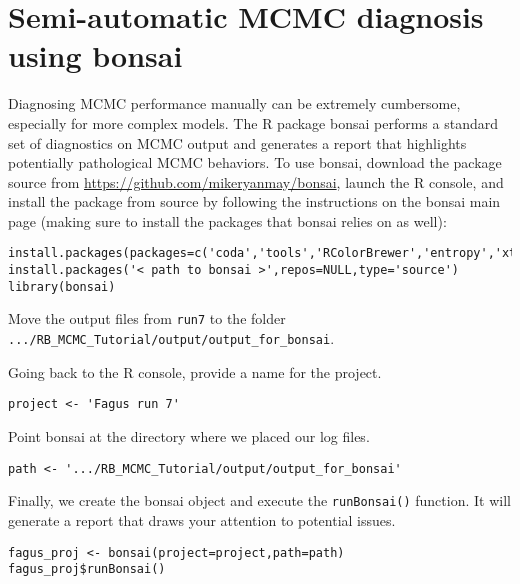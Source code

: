 	
	

\bigskip
\section{Semi-automatic MCMC diagnosis using bonsai}

Diagnosing MCMC performance manually can be extremely cumbersome, especially for more complex models.
The R package bonsai performs a standard set of diagnostics on MCMC output and generates a report that highlights potentially pathological MCMC behaviors.
To use bonsai, download the package source from \href{https://github.com/mikeryanmay/bonsai}{https://github.com/mikeryanmay/bonsai}, launch the R console, and install the package from source by following the instructions on the bonsai main page (making sure to install the packages that bonsai relies on as well):
{\tt \begin{snugshade*}
\begin{lstlisting}
install.packages(packages=c('coda','tools','RColorBrewer','entropy','xtable'),dependencies=TRUE)
install.packages('< path to bonsai >',repos=NULL,type='source')
library(bonsai)
\end{lstlisting}
\end{snugshade*}}

Move the output files from \texttt{run7} to the folder \verb!.../RB_MCMC_Tutorial/output/output_for_bonsai!.

Going back to the R console, provide a name for the project.
{\tt \begin{snugshade*}
\begin{lstlisting}
project <- 'Fagus run 7'
\end{lstlisting}
\end{snugshade*}}

Point bonsai at the directory where we placed our log files.
{\tt \begin{snugshade*}
\begin{lstlisting}
path <- '.../RB_MCMC_Tutorial/output/output_for_bonsai'
\end{lstlisting}
\end{snugshade*}}

Finally, we create the bonsai object and execute the \texttt{runBonsai()} function.
It will generate a report that draws your attention to potential issues.
{\tt \begin{snugshade*}
\begin{lstlisting}
fagus_proj <- bonsai(project=project,path=path)
fagus_proj$runBonsai()
\end{lstlisting}
\end{snugshade*}}

